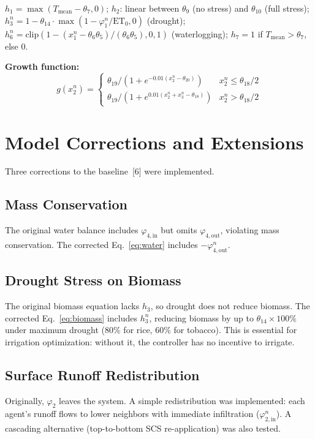 \documentclass[12pt, a4paper]{article}
\begin{document}
$h_1 = \max(T_{\text{mean}} - \theta_7, 0)$; $h_2$: linear between $\theta_9$ (no stress) and $\theta_{10}$ (full stress); $h_3^n = 1 - \theta_{14} \cdot \max(1 - \varphi_1^n/\text{ET}_0, 0)$ (drought); $h_6^n = \text{clip}(1 - (x_1^n - \theta_6\theta_5)/(\theta_6\theta_5), 0, 1)$ (waterlogging); $h_7 = 1$ if $T_{\text{mean}} > \theta_7$, else 0.

\textbf{Growth function:}
\begin{equation}
g(x_2^n) = \begin{cases}
\theta_{19}/(1 + e^{-0.01(x_2^n - \theta_{20})}) & x_2^n \leq \theta_{18}/2 \\
\theta_{19}/(1 + e^{0.01(x_2^n + x_3^n - \theta_{18})}) & x_2^n > \theta_{18}/2
\end{cases}
\end{equation}


\section{Model Corrections and Extensions}

Three corrections to the baseline~[6] were implemented.

\subsection{Mass Conservation}

The original water balance includes $\varphi_{4,\text{in}}$ but omits $\varphi_{4,\text{out}}$, violating mass conservation. The corrected Eq.~\ref{eq:water} includes $-\varphi_{4,\text{out}}^n$.

\subsection{Drought Stress on Biomass}

The original biomass equation lacks $h_3$, so drought does not reduce biomass. The corrected Eq.~\ref{eq:biomass} includes $h_3^n$, reducing biomass by up to $\theta_{14} \times 100\%$ under maximum drought (80\% for rice, 60\% for tobacco). This is essential for irrigation optimization: without it, the controller has no incentive to irrigate.

\subsection{Surface Runoff Redistribution}
\label{sec:runoff}

Originally, $\varphi_2$ leaves the system. A simple redistribution was implemented: each agent's runoff flows to lower neighbors with immediate infiltration ($\varphi_{2,\text{in}}^n$). A cascading alternative (top-to-bottom SCS re-application) was also tested.
\end{document}
